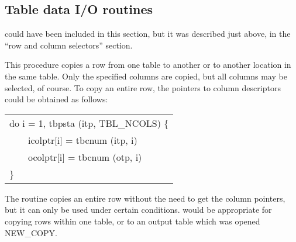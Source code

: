 \callseqtable

\subsection{Table data I/O routines}

 could have been included in this section,
but it was described just above,
in the ``row and column selectors'' section.

\begin{callseq}
\end{callseq}

This procedure copies a row from one table to another
or to another location in the same table.
Only the specified columns are copied,
but all columns may be selected, of course.
To copy an entire row,
the pointers to column descriptors could be obtained as follows:
\begin{center}
\begin{tabular}{l}
do i = 1, tbpsta (itp, TBL\_NCOLS) \{ \\
~~~~icolptr[i] = tbcnum (itp, i) \\
~~~~ocolptr[i] = tbcnum (otp, i) \\
\} \\
\end{tabular}
\end{center}

\callseqtable

The  routine copies an entire row
without the need to get the column pointers,
but it can only be used under certain conditions.
 would be appropriate for copying rows within one table,
or to an output table which was opened NEW\_COPY.

\begin{callseq}
\end{callseq}

